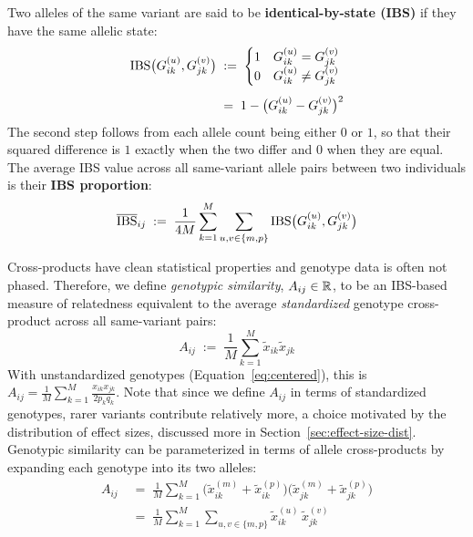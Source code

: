 \documentclass[12pt]{article}
\numberwithin{equation}{section}
\begin{document}
Two alleles of the same variant are said to be \textbf{identical-by-state (IBS)} if they have the same allelic state:
\begin{equation}\label{eq:ibs}
\begin{aligned}
    \mathrm{IBS}\big(G^{(u)}_{ik}, G^{(v)}_{jk}\big)
    \;&:=\; \begin{cases}
        1 & G^{(u)}_{ik} = G^{(v)}_{jk} \\
        0 & G^{(u)}_{ik} \neq G^{(v)}_{jk}
    \end{cases} \\[4pt]
    \;&=\; 1 - \big(G^{(u)}_{ik} - G^{(v)}_{jk}\big)^2
\end{aligned}
\end{equation}
The second step follows from each allele count being either $0$ or $1$, so that their squared difference is $1$ exactly when the two differ and $0$ when they are equal.
The average IBS value across all same-variant allele pairs between two individuals is their \textbf{IBS proportion}:
\begin{equation}\label{eq:ibs-proportion}
    \overline{\mathrm{IBS}}_{ij} \;:=\; \frac{1}{4M} \sum_{k=1}^{M} \sum_{u,v \in \{m,p\}} \mathrm{IBS}\big(G^{(u)}_{ik}, G^{(v)}_{jk}\big)
\end{equation}

Cross-products have clean statistical properties and genotype data is often not phased.
Therefore, we define \emph{genotypic similarity}, $A_{ij} \in \mathbb{R}$, to be an IBS-based measure of relatedness equivalent to the average \emph{standardized} genotype cross-product across all same-variant pairs:
\begin{equation}\label{eq:grm}
    A_{ij} \;:=\; \frac{1}{M} \sum_{k=1}^{M} \tilde{x}_{ik} \tilde{x}_{jk}
\end{equation}
With unstandardized genotypes (Equation~\eqref{eq:centered}), this is $A_{ij} = \frac{1}{M} \sum_{k=1}^{M} \frac{x_{ik} x_{jk}}{2 p_k q_k}$.
Note that since we define $A_{ij}$ in terms of standardized genotypes, rarer variants contribute relatively more, a choice motivated by the distribution of effect sizes, discussed more in Section~\ref{sec:effect-size-dist}.
Genotypic similarity can be parameterized in terms of allele cross-products by expanding each genotype into its two alleles:
\begin{equation}\label{eq:grm-alleles}
\begin{aligned}
    A_{ij} \;&=\; \frac{1}{M} \sum_{k=1}^{M} \big(\tilde{x}^{(m)}_{ik} + \tilde{x}^{(p)}_{ik}\big)\big(\tilde{x}^{(m)}_{jk} + \tilde{x}^{(p)}_{jk}\big) \\[4pt]
    \;&=\; \frac{1}{M} \sum_{k=1}^{M} \sum_{u,v \in \{m,p\}} \tilde{x}^{(u)}_{ik}\, \tilde{x}^{(v)}_{jk}
\end{aligned}
\end{equation}
\end{document}
